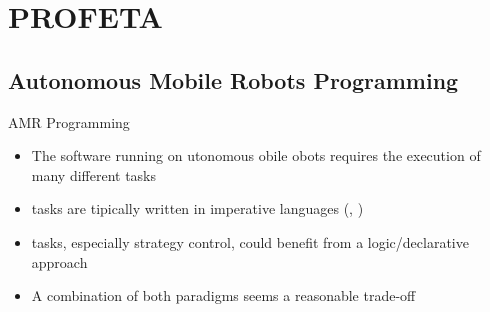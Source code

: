 \section{PROFETA}

\subsection{Autonomous Mobile Robots Programming}
\begin{frame}[label=1]{AMR Programming}
  \begin{itemize}
    \item
      The software running on utonomous obile obots
      requires the execution of many different tasks
\N\N  
    \item
       tasks are tipically written in imperative languages 
      (, )
\N
    \item
       tasks, especially strategy control, could benefit 
      from a logic/declarative approach
\N\N  
    \item
      A combination of both paradigms seems a reasonable trade-off
  \end{itemize}
% 
\N\N
\end{frame}



